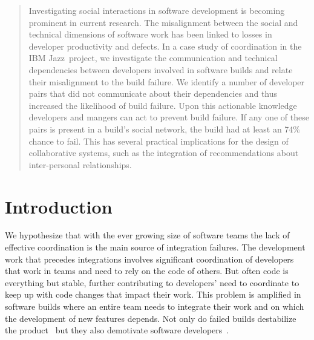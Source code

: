 \documentclass[conference]{IEEEtran}
\begin{document}
\begin{abstract}
Investigating social interactions in software development is becoming 
prominent in current research. The misalignment
between the social and technical dimensions of software work has been
linked to losses in developer productivity and defects. In a case study of
coordination in the IBM Jazz\texttrademark\ project, we investigate the
communication and technical dependencies between developers involved in
software builds and relate their misalignment to the build failure.  
We identify a number of developer pairs that did not communicate about their dependencies and thus increased the likelihood of build failure. 
Upon this actionable knowledge developers and mangers can act to prevent build failure. 
If any one of these pairs is present in a build's social network, the build had at least an 74\% chance to fail. 
This has several practical implications for the design of collaborative systems, such as the integration of recommendations about inter-personal relationships.
\end{abstract}





%
\IEEEpeerreviewmaketitle

\section{Introduction}
We hypothesize that with the ever growing size of software teams the lack of
effective coordination is the main source of integration failures. The
development work that precedes integrations involves significant coordination of
developers that work in teams and need to rely on the code of others. 
But often code is everything but stable, further contributing to
developers' need to coordinate to keep up with code changes that impact their work. This problem is
amplified in software builds where an entire team needs to integrate their work
and on which the development of new features depends. Not only do
failed builds destabilize the product~\cite{cusumano1997} but they also demotivate
software developers~\cite{holck2004}.
\end{document}
